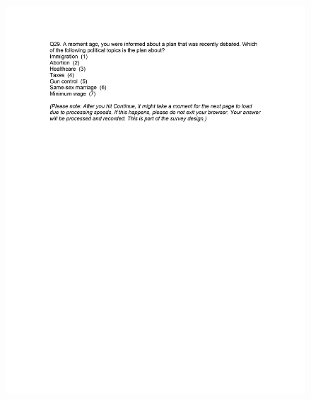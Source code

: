 \documentclass[12pt,econ]{sources/authesis}
\makeatletter
\def\maxwidth{\ifdim\Gin@nat@width>\linewidth\linewidth
\else\Gin@nat@width\fi}
\let\Oldincludegraphics\includegraphics
\renewcommand{\includegraphics}[1]{\Oldincludegraphics[width=\maxwidth]{#1}}
\makeatother
\begin{document}
\begin{figure}[hbt]
  \centering
\includegraphics{data/framing/appendix/questionnaire/questionnaire17.jpg}
\end{figure}
\end{document}
